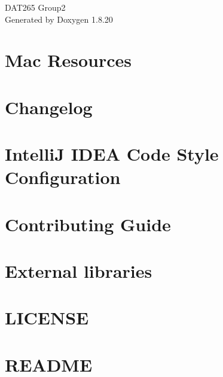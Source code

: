 \let\mypdfximage\pdfximage\def\pdfximage{\immediate\mypdfximage}\documentclass[twoside]{book}
\newcommand{\+}{\discretionary{\mbox{\scriptsize$\hookleftarrow$}}{}{}}
\newcommand{\clearemptydoublepage}{%
  \newpage{\pagestyle{empty}\cleardoublepage}%
}
\begin{document}
\hypersetup{pageanchor=false,
             bookmarksnumbered=true,
             pdfencoding=unicode
            }
\begin{titlepage}
\vspace*{7cm}
\begin{center}%
{\Large D\+A\+T265 Group2 }\\
\vspace*{1cm}
{\large Generated by Doxygen 1.8.20}\\
\end{center}
\end{titlepage}
\clearemptydoublepage
{}
\tableofcontents
\clearemptydoublepage
{}
\hypersetup{pageanchor=true}

\chapter{Mac Resources}
\label{md_buildres_mac__r_e_a_d_m_e}

\chapter{Changelog}
\label{md__c_h_a_n_g_e_l_o_g}

\chapter{IntelliJ I\+D\+EA Code Style Configuration}
\label{md_config__r_e_a_d_m_e}

\chapter{Contributing Guide}
\label{md__c_o_n_t_r_i_b_u_t_i_n_g}

\chapter{External libraries}
\label{md_external-libraries}

\chapter{L\+I\+C\+E\+N\+SE}
\label{md__l_i_c_e_n_s_e}

\chapter{R\+E\+A\+D\+ME}
\label{md__r_e_a_d_m_e}

\end{document}
